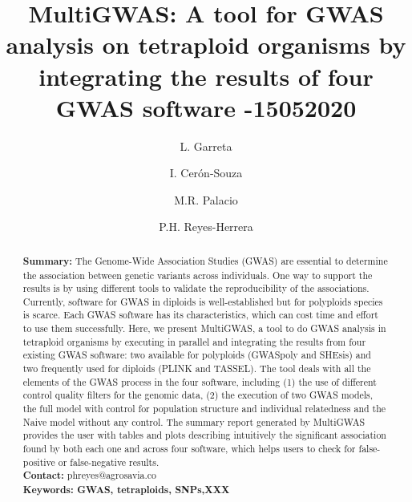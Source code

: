 \documentclass{article}
\begin{document}
\title{MultiGWAS: A tool for GWAS analysis on tetraploid organisms by integrating the results of four GWAS software -15052020}

\author[1]{L. Garreta}

\author[1]{I. Cer\'{o}n-Souza}
\author[2]{M.R. Palacio}
\author[1]{P.H. Reyes-Herrera}




\maketitle

\begin{abstract}
\textbf{Summary:} The Genome-Wide Association Studies (GWAS) are essential to determine the association between genetic variants across individuals. One way to support the results is by using different tools to validate the reproducibility of the associations. Currently, software for GWAS in diploids is well-established but for polyploids species is scarce. Each GWAS software has its characteristics, which can cost time and effort to use them successfully. Here, we present MultiGWAS, a tool to do GWAS analysis in tetraploid organisms by executing in parallel and integrating the results from four existing GWAS software: two available for polyploids (GWASpoly and SHEsis) and two frequently used for diploids (PLINK and TASSEL). The tool deals with all the elements of the GWAS process in the four software, including (1) the use of different control quality filters for the genomic data, (2) the execution of two GWAS models, the full model with control for population structure and individual relatedness and the Naive model without any control. The summary report generated by MultiGWAS provides the user with tables and plots describing intuitively the significant association found by both each one and across four software, which helps users to check for false-positive or false-negative results.\\
\textbf{Contact:} phreyes@agrosavia.co\\

\textbf{Keywords: GWAS, tetraploids, SNPs,XXX}

\end{abstract}
\maketitle 
\end{document}
